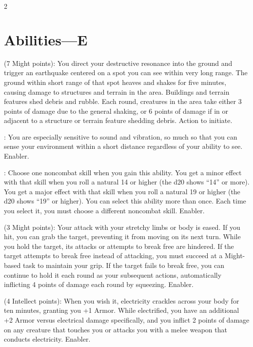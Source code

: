 \begin{multicols}{2}

\section{Abilities—E}

 (7 Might points): You direct your destructive resonance into the ground and trigger an earthquake centered on a spot you can see within very long range. The ground within short range of that spot heaves and shakes for five minutes, causing damage to structures and terrain in the area. Buildings and terrain features shed debris and rubble. Each round, creatures in the area take either 3 points of damage due to the general shaking, or 6 points of damage if in or adjacent to a structure or terrain feature shedding debris. Action to initiate. 
 
: You are especially sensitive to sound and vibration, so much so that you can sense your environment within a short distance regardless of your ability to see. Enabler. 
 
: Choose one noncombat skill when you gain this ability. You get a minor effect with that skill when you roll a natural 14 or higher (the d20 shows “14” or more). You get a major effect with that skill when you roll a natural 19 or higher (the d20 shows “19” or higher). You can select this ability more than once. Each time you select it, you must choose a different noncombat skill. Enabler. 
 
 (3 Might points): Your attack with your stretchy limbs or body is eased. If you hit, you can grab the target, preventing it from moving on its next turn. While you hold the target, its attacks or attempts to break free are hindered. If the target attempts to break free instead of attacking, you must succeed at a Might-based task to maintain your grip. If the target fails to break free, you can continue to hold it each round as your subsequent actions, automatically inflicting 4 points of damage each round by squeezing. Enabler.

 (4 Intellect points): When you wish it, electricity crackles across your body for ten minutes, granting you +1 Armor. While electrified, you have an additional +2 Armor versus electrical damage specifically, and you inflict 2 points of damage on any creature that touches you or attacks you with a melee weapon that conducts electricity. Enabler. 
 

\end{multicols}
